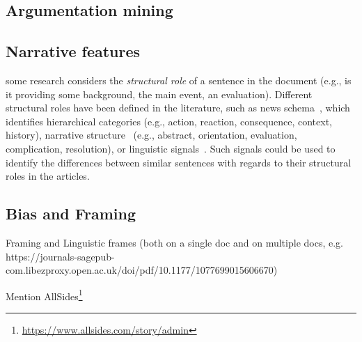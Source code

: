 \subsection{Argumentation mining}

\subsection{Narrative features}

\cite{zahid2019towards}

some research considers the \emph{structural role} of a sentence in the document (e.g., is it providing some background, the main event, an evaluation).
Different structural roles have been defined in the literature, such as 
news schema~\cite{bell1991language}, which identifies hierarchical categories (e.g., action, reaction, consequence, context, history), narrative structure~\cite{bell2005news} (e.g., abstract, orientation, evaluation, complication, resolution), or linguistic signals~\cite{zahid2019towards,marcu2000theory}. 
Such signals could be used to identify the differences between similar sentences with regards to their structural roles in the articles. 

\subsection{Bias and Framing}

Framing and Linguistic frames (both on a single doc and on multiple docs, e.g. https://journals-sagepub-com.libezproxy.open.ac.uk/doi/pdf/10.1177/1077699015606670)

Mention AllSides\footnote{\url{https://www.allsides.com/story/admin}}

